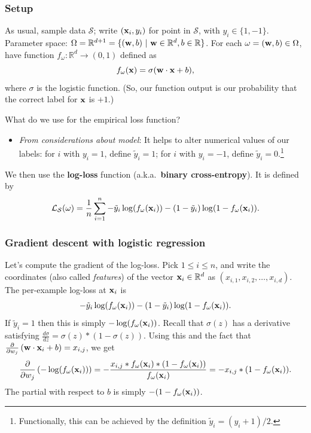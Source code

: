 \documentclass[smaller]{beamer}
\theoremstyle{example}
\begin{document}
\begin{frame}
\frametitle{Setup}
As usual, sample data $\mathcal S$; write $({\bf x}_i, y_i)$ for point in $\mathcal S$, with $y_i\in\{1, -1\}$. \newline 
Parameter space: $\Omega = \mathbb R^{d+1} = \{({\bf w},b)\ |\ {\bf w}\in\mathbb R^d, b\in\mathbb R\}$. For each $\omega = ({\bf w},b) \in \Omega$, have function $f_{\omega}:\mathbb R^d\to(0,1)$ defined as 
        \[f_{\omega}({\bf x}) = \sigma({\bf w}\cdot{\bf x} + b),\]
where $\sigma$ is the logistic function. (So, our function output is our probability that the correct label for ${\bf x}$ is $+1$.)

\vspace*{12pt}
What do we use for the empirical loss function? 

\begin{itemize}
    \item \textit{From considerations about model}: It helps to alter numerical values of our labels: for $i$ with $y_i=1$, define $\tilde y_i = 1$; for $i$ with $y_i=-1$, define $\tilde y_i = 0$.\footnote{Functionally, this can be achieved by the definition $\tilde y_i = (y_i+1)/2$.}
\end{itemize}

\pause
We then use the \textbf{log-loss} function (a.k.a.\ \textbf{binary cross-entropy}). It is defined by 
    \[\mathcal L_{\mathcal S}(\omega) = \frac{1}{n}\sum_{i=1}^n -\tilde y_i\log(f_{\omega}({\bf x}_i)) - (1-\tilde y_i)\log(1 - f_{\omega}({\bf x}_i)) .\]
\end{frame}

\begin{frame}
\frametitle{Gradient descent with logistic regression}
Let's compute the gradient of the log-loss. Pick $1\le i\le n$, and write the coordinates (also called \textit{features}) of the vector ${\bf x}_i\in\mathbb R^d$ as $(x_{i,1},x_{i,2},\ldots,x_{i,d})$.\newline \pause
The per-example log-loss at ${\bf x}_i$ is 
        \[-\tilde y_i\log(f_{\omega}({\bf x}_i)) - (1-\tilde y_i)\log(1 - f_{\omega}({\bf x}_i)).\]
\pause
If $\tilde y_i = 1$ then this is simply $-\log(f_{\omega}({\bf x}_i))$. Recall that $\sigma(z)$ has a derivative satisfying $\frac{d\sigma}{dz} = \sigma(z)\ast(1 - \sigma(z))$. \pause Using this and the fact that $\frac{\partial}{\partial w_j}\left({\bf w}\cdot{\bf x}_i + b\right) = x_{i,j}$, we get 
        \[\frac{\partial}{\partial w_j}\left( -\log(f_{\omega}({\bf x}_i)) \right) = - \frac{x_{i,j}\ast f_{\omega}({\bf x}_i)\ast(1 - f_{\omega}({\bf x}_i))}{f_{\omega}({\bf x}_i)} = -x_{i,j}\ast(1-f_{\omega}({\bf x}_i)).\]
\pause
The partial with respect to $b$ is simply $-(1-f_{\omega}({\bf x}_i))$.

\end{frame}
\end{document}
